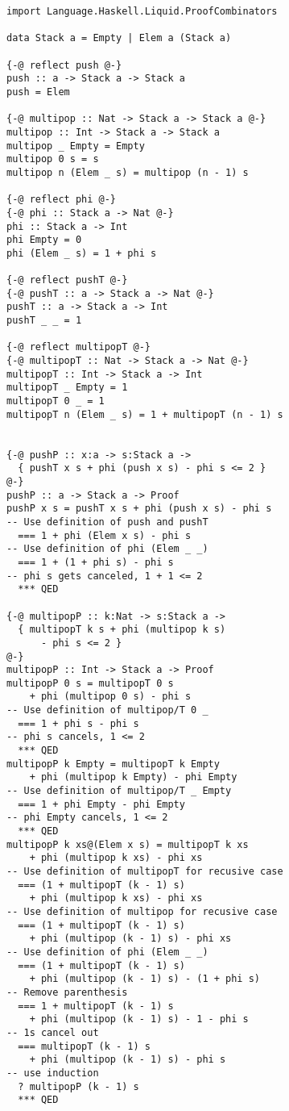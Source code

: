 \documentclass[sigplan,screen]{acmart}
\begin{document}
\begin{lstlisting}
import Language.Haskell.Liquid.ProofCombinators

data Stack a = Empty | Elem a (Stack a)

{-@ reflect push @-}
push :: a -> Stack a -> Stack a
push = Elem

{-@ multipop :: Nat -> Stack a -> Stack a @-}
multipop :: Int -> Stack a -> Stack a
multipop _ Empty = Empty
multipop 0 s = s
multipop n (Elem _ s) = multipop (n - 1) s

{-@ reflect phi @-}
{-@ phi :: Stack a -> Nat @-}
phi :: Stack a -> Int
phi Empty = 0
phi (Elem _ s) = 1 + phi s

{-@ reflect pushT @-}
{-@ pushT :: a -> Stack a -> Nat @-}
pushT :: a -> Stack a -> Int
pushT _ _ = 1

{-@ reflect multipopT @-}
{-@ multipopT :: Nat -> Stack a -> Nat @-}
multipopT :: Int -> Stack a -> Int
multipopT _ Empty = 1
multipopT 0 _ = 1
multipopT n (Elem _ s) = 1 + multipopT (n - 1) s


{-@ pushP :: x:a -> s:Stack a ->
  { pushT x s + phi (push x s) - phi s <= 2 }
@-}
pushP :: a -> Stack a -> Proof
pushP x s = pushT x s + phi (push x s) - phi s
-- Use definition of push and pushT
  === 1 + phi (Elem x s) - phi s
-- Use definition of phi (Elem _ _)
  === 1 + (1 + phi s) - phi s
-- phi s gets canceled, 1 + 1 <= 2
  *** QED

{-@ multipopP :: k:Nat -> s:Stack a ->
  { multipopT k s + phi (multipop k s)
      - phi s <= 2 }
@-}
multipopP :: Int -> Stack a -> Proof
multipopP 0 s = multipopT 0 s
    + phi (multipop 0 s) - phi s
-- Use definition of multipop/T 0 _
  === 1 + phi s - phi s
-- phi s cancels, 1 <= 2
  *** QED
multipopP k Empty = multipopT k Empty
    + phi (multipop k Empty) - phi Empty
-- Use definition of multipop/T _ Empty
  === 1 + phi Empty - phi Empty
-- phi Empty cancels, 1 <= 2
  *** QED
multipopP k xs@(Elem x s) = multipopT k xs
    + phi (multipop k xs) - phi xs
-- Use definition of multipopT for recusive case
  === (1 + multipopT (k - 1) s)
    + phi (multipop k xs) - phi xs
-- Use definition of multipop for recusive case
  === (1 + multipopT (k - 1) s)
    + phi (multipop (k - 1) s) - phi xs
-- Use definition of phi (Elem _ _)
  === (1 + multipopT (k - 1) s)
    + phi (multipop (k - 1) s) - (1 + phi s)
-- Remove parenthesis
  === 1 + multipopT (k - 1) s
    + phi (multipop (k - 1) s) - 1 - phi s
-- 1s cancel out
  === multipopT (k - 1) s
    + phi (multipop (k - 1) s) - phi s
-- use induction
  ? multipopP (k - 1) s
  *** QED
\end{lstlisting}
\end{document}
